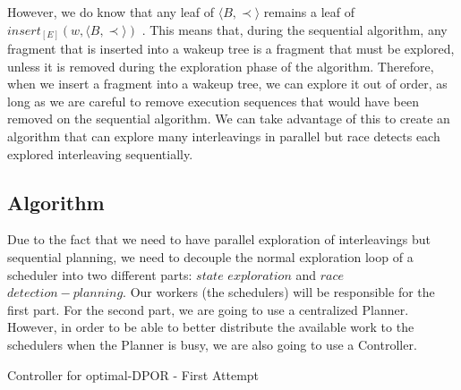 However, we do know that any leaf of $\langle B , \prec \rangle$ remains a leaf of $insert_{[E]}(w,\langle B , \prec \rangle)$
\cite{AbdullaAronisJohnssonSagonasDPOR2014}. This means that, during the sequential algorithm, any fragment that
is inserted into a wakeup tree is a fragment that must be explored, unless it is removed during
the exploration phase of the algorithm. Therefore, when we insert a fragment into a wakeup tree,
we can explore it out of order, as long as we are careful to remove execution sequences that
would have been removed on the sequential algorithm. We can take advantage of this to create an algorithm that can explore 
many interleavings in parallel but race detects each explored interleaving sequentially.

\subsection{Algorithm}

Due to the fact that we need to have parallel exploration of interleavings but sequential planning, we need to decouple
the normal exploration loop of a scheduler into two different parts: $state$ $exploration$ and $race$ $detection-planning$.
Our workers (the schedulers) will be responsible for the first part. For the second part, we are going to use a centralized
Planner. However, in order to be able to better distribute the available work to the schedulers when the Planner is busy,
we are also going to use a Controller.

\begin{algorithm}
    \caption{Controller for optimal-DPOR - First Attempt}
    \label{optcontrollerloop}

\end{algorithm}


